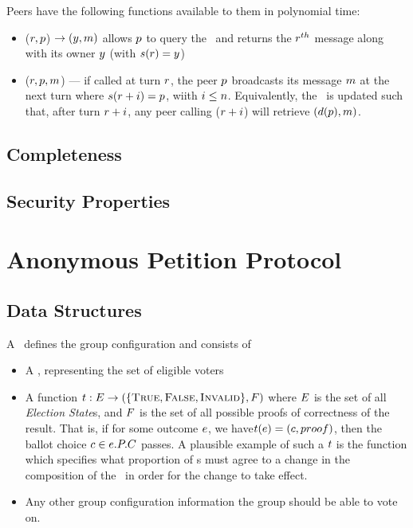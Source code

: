 Peers have the following functions available to them in polynomial time:
\begin{itemize}
  \item \NameReceive($r, p$) $\to (y, m)$ allows $p$ to query
    the \HistoryOracle~and returns the $r^{th}$ message along with its owner
    $y$ (with $s(r) = y $)
  \item \NameSend($r, p, m$) --- if called at turn $r$, the peer
    $p$ broadcasts its message $m$ at the next turn where
    $s(r+i) = p$, wiith $i \le n$. Equivalently, the
    \HistoryOracle~is updated such that, after turn $r+i$, any peer calling
    \NameReceive($r+i$) will retrieve $(d(p), m)$.
\end{itemize}

\subsection{Completeness}

\subsection{Security Properties}

\section{Anonymous Petition Protocol}
\subsection{Data Structures}
  A \KwManifest~defines the group configuration and consists of
  \begin{itemize}
    \item A \KwRoster, representing the set of eligible voters
    \item A function $t : E \to (\{\textsc{True}, \textsc{False}, \textsc{Invalid}\}, F)$
      where $E$ is the set of all \emph{Election State}s, and
      $F$ is the set of all possible proofs of correctness of the result.
      That is, if for some outcome $e$, we
      have$t(e) = (c, proof)$, then the ballot
      choice $c \in e.P.C$ passes.  A
      plausible example of such a $t$ is the function which specifies
      what proportion of \KwPeer s must agree to a change in the composition of
      the \KwRoster~in order for the change to take effect.
    \item Any other group configuration information the group should be able to
      vote on.
  \end{itemize}

